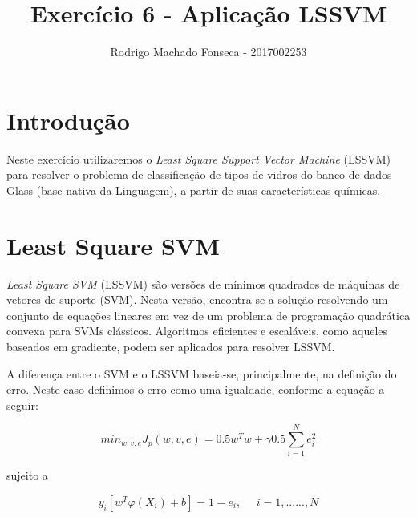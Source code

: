 \documentclass[12pt]{article}
\begin{document}

\pagestyle{fancy}
\fancyhf{}
\renewcommand{\headrulewidth}{0.4pt}
\fancyfoot[C]{\thepage}
\renewcommand{\footrulewidth}{0.4pt}
\fancyfoot[C]{\thepage}
\title{\LARGE \bf
 Exercício 6  -  Aplicação LSSVM}
\author{ Rodrigo Machado Fonseca - 2017002253}
\thispagestyle{fancy}
\maketitle
\thispagestyle{fancy}

\section{Introdução}

  \par Neste exercício utilizaremos o \textit{Least Square Support Vector Machine} (LSSVM) para resolver o problema de classificação de tipos de vidros do banco de dados Glass (base nativa da Linguagem), a partir de suas características químicas.

\section{Least Square SVM}

  \par \textit{Least Square SVM} (LSSVM) são versões de mínimos quadrados de máquinas de vetores de suporte (SVM). Nesta versão, encontra-se a solução resolvendo um conjunto de equações lineares em vez de um problema de programação quadrática convexa para SVMs clássicos. Algoritmos eficientes e escaláveis, como aqueles baseados em gradiente, podem ser aplicados para resolver LSSVM.
  
  \par A diferença entre o SVM e o LSSVM baseia-se, principalmente, na definição do erro. Neste caso definimos o erro como uma igualdade, conforme a equação a seguir:
  
\begin{equation}
min_{w, v,e} J_p(w,v,e)=0.5w^{T}w+\gamma 0.5\sum_{i=1}^{N}e_i^2
\end{equation}

sujeito a 

\begin{equation}
y_i[w^T\varphi(X_i)+b]=1-e_i, \ \ \ \ \ \ i=1,......,N
\end{equation}
\end{document}
